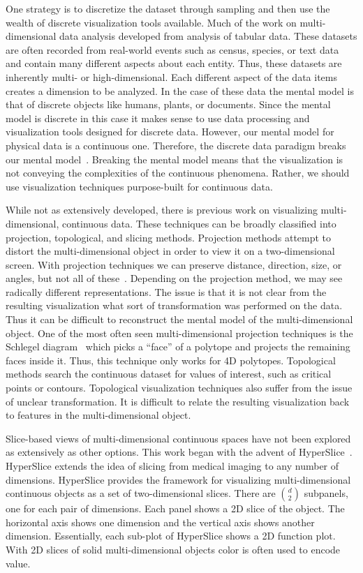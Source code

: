 One strategy is to discretize the dataset through sampling and then use the
wealth of discrete visualization tools available. Much of the work on
multi-dimensional data analysis developed from analysis of 
tabular data. These datasets are often recorded from real-world
events such as census, species, or text data and contain many different aspects
about each entity. Thus, these datasets are inherently multi- or high-dimensional.
Each different aspect of the data items creates a dimension to be analyzed. 
In the case of these data the mental model is that of discrete objects
like humans, plants, or documents. Since the mental model is discrete in this
case it makes sense to use data processing and visualization tools designed for
discrete data.  However, our mental model for physical data is a continuous 
one. Therefore, the
discrete data paradigm breaks our mental model~\cite{Tory:2004a,Liu:2010a}. 
Breaking the mental model means that the visualization is not conveying the
complexities of the continuous phenomena.
Rather, we
should use visualization techniques purpose-built for continuous data.

While not as
extensively developed, there is previous work on visualizing multi-dimensional,
continuous data. These techniques can be broadly classified into projection,
topological, and slicing methods.  
Projection methods attempt to
distort the multi-dimensional object in order to view it on a two-dimensional
screen. With projection techniques we can preserve distance, direction, size,
or angles, but not all of 
these~\cite{Snyder:1987}. 
Depending on the
projection method, we may see radically different representations.  The issue
is that it is not clear from the resulting visualization what sort of
transformation was performed on the data.  Thus it can be difficult to
reconstruct the mental model of the multi-dimensional object.  One of the most
often seen multi-dimensional projection techniques is the Schlegel
diagram~\cite{Sommerville:1929} which picks a ``face'' of a polytope and projects the
remaining faces inside it. Thus, this technique only works for 4D polytopes.
Topological methods search the continuous dataset for values of interest, such
as critical points or contours.  Topological visualization techniques also
suffer from the issue of unclear transformation. It is difficult to relate the
resulting visualization back to features in the multi-dimensional object.

Slice-based views of multi-dimensional continuous spaces have not been explored
as extensively as other options.  This work began with the advent of
HyperSlice~\cite{Wijk:1993}.  HyperSlice extends the idea of slicing from
medical imaging to any number of dimensions.  HyperSlice provides the framework
for visualizing multi-dimensional continuous objects as a set of
two-dimensional slices.  There are $d \choose 2$ subpanels, one for each pair
of dimensions. Each panel shows a 2D slice of the object. The horizontal axis
shows one dimension and the vertical axis shows another dimension. Essentially,
each sub-plot of HyperSlice shows a 2D function plot. With 2D slices of solid
multi-dimensional objects color is often used to encode value. 

